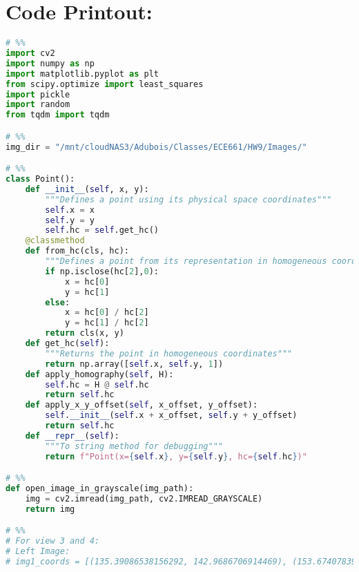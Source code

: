 \documentclass{article}
\begin{document}
\section{Code Printout:}
\begin{lstlisting}[language=Python]
# %%
import cv2
import numpy as np
import matplotlib.pyplot as plt
from scipy.optimize import least_squares
import pickle
import random
from tqdm import tqdm

# %%
img_dir = "/mnt/cloudNAS3/Adubois/Classes/ECE661/HW9/Images/"

# %%
class Point():
    def __init__(self, x, y):
        """Defines a point using its physical space coordinates"""
        self.x = x
        self.y = y
        self.hc = self.get_hc()
    @classmethod
    def from_hc(cls, hc):
        """Defines a point from its representation in homogeneous coordinates"""
        if np.isclose(hc[2],0):
            x = hc[0]
            y = hc[1]
        else:
            x = hc[0] / hc[2]
            y = hc[1] / hc[2]
        return cls(x, y)
    def get_hc(self):
        """Returns the point in homogeneous coordinates"""
        return np.array([self.x, self.y, 1])
    def apply_homography(self, H):
        self.hc = H @ self.hc
        return self.hc
    def apply_x_y_offset(self, x_offset, y_offset):
        self.__init__(self.x + x_offset, self.y + y_offset)
        return self.hc
    def __repr__(self):
        """To string method for debugging"""
        return f"Point(x={self.x}, y={self.y}, hc={self.hc})"

# %%
def open_image_in_grayscale(img_path):
    img = cv2.imread(img_path, cv2.IMREAD_GRAYSCALE)
    return img

# %%
# For view 3 and 4:
# Left Image:
# img1_coords = [(135.39086538156292, 142.9686706914469), (153.67407839960097, 150.35743901737024), (97.53385960303707, 153.29330863104485), (150.01673332962673, 242.3620485533101), (154.906077176412, 213.23856563984987), (166.59798637524642, 217.06500865037748), (168.20133062334986, 236.29312439383074), (174.10846178282134, 228.46617560753106), (158.30688593123517, 251.50398712946978), (140.20318683016325, 286.359314173019), (137.86601754532887, 291.3675340690927), (123.99692097166292, 154.54893583465073), (117.26992782683912, 120.09360509287032), (141.2245863425531, 121.40618912112862), (110.44752003348668, 122.43507091165702), (144.4775692921619, 133.73249617162207), (156.46386194602724, 141.5855844620856), (110.71053591493266, 256.13154910371065), (125.36770173155205, 261.28376496652237), (136.11628999707295, 264.9258485936823)]


\end{lstlisting}
\end{document}
